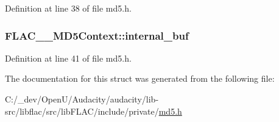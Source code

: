 Definition at line 38 of file md5.\+h.

\subsubsection[{\texorpdfstring{internal\+\_\+buf}{internal_buf}}]{ F\+L\+A\+C\+\_\+\+\_\+\+M\+D5\+Context\+::internal\+\_\+buf}\hypertarget{struct_f_l_a_c_____m_d5_context_ab8c8bfa92a7a68d9aea5bf900b800fe2}{}\label{struct_f_l_a_c_____m_d5_context_ab8c8bfa92a7a68d9aea5bf900b800fe2}


Definition at line 41 of file md5.\+h.



The documentation for this struct was generated from the following file\+:\begin{DoxyCompactItemize}
\item 
C\+:/\+\_\+dev/\+Open\+U/\+Audacity/audacity/lib-\/src/libflac/src/lib\+F\+L\+A\+C/include/private/\hyperlink{libflac_2src_2lib_f_l_a_c_2include_2private_2md5_8h}{md5.\+h}\end{DoxyCompactItemize}
